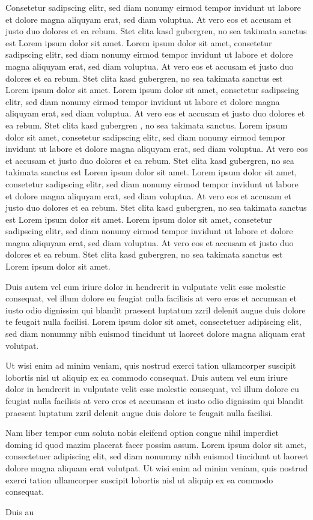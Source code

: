 Consetetur sadipscing elitr, sed diam nonumy eirmod tempor invidunt ut labore et dolore magna aliquyam erat, sed diam
voluptua. At vero eos et accusam et justo duo dolores et ea rebum. Stet clita kasd gubergren, no sea takimata sanctus
est Lorem ipsum dolor sit amet. Lorem ipsum dolor sit amet, consetetur sadipscing elitr, sed diam nonumy eirmod
tempor invidunt ut labore et dolore magna aliquyam erat, sed diam voluptua. At vero eos et accusam et justo duo
dolores et ea rebum. Stet clita kasd gubergren, no sea takimata sanctus est Lorem ipsum dolor sit amet. Lorem ipsum
dolor sit amet, consetetur sadipscing elitr, sed diam nonumy eirmod tempor invidunt ut labore et dolore magna
aliquyam erat, sed diam voluptua. At vero eos et accusam et justo duo dolores et ea rebum. Stet clita kasd gubergren
, no sea takimata sanctus. Lorem ipsum dolor sit amet, consetetur sadipscing elitr, sed diam nonumy eirmod tempor
invidunt ut labore et dolore magna aliquyam erat, sed diam voluptua. At vero eos et accusam et justo duo dolores et
ea rebum. Stet clita kasd gubergren, no sea takimata sanctus est Lorem ipsum dolor sit amet. Lorem ipsum dolor sit
amet, consetetur sadipscing elitr, sed diam nonumy eirmod tempor invidunt ut labore et dolore magna aliquyam erat,
sed diam voluptua. At vero eos et accusam et justo duo dolores et ea rebum. Stet clita kasd gubergren, no sea
takimata sanctus est Lorem ipsum dolor sit amet. Lorem ipsum dolor sit amet, consetetur sadipscing elitr, sed diam
nonumy eirmod tempor invidunt ut labore et dolore magna aliquyam erat, sed diam voluptua. At vero eos et accusam et
justo duo dolores et ea rebum. Stet clita kasd gubergren, no sea takimata sanctus est Lorem ipsum dolor sit amet.

Duis autem vel eum iriure dolor in hendrerit in vulputate velit esse molestie consequat, vel illum dolore eu feugiat
nulla facilisis at vero eros et accumsan et iusto odio dignissim qui blandit praesent luptatum zzril delenit augue
duis dolore te feugait nulla facilisi. Lorem ipsum dolor sit amet, consectetuer adipiscing elit, sed diam nonummy
nibh euismod tincidunt ut laoreet dolore magna aliquam erat volutpat.

Ut wisi enim ad minim veniam, quis nostrud exerci tation ullamcorper suscipit lobortis nisl ut aliquip ex ea commodo
consequat. Duis autem vel eum iriure dolor in hendrerit in vulputate velit esse molestie consequat, vel illum dolore
eu feugiat nulla facilisis at vero eros et accumsan et iusto odio dignissim qui blandit praesent luptatum zzril
delenit augue duis dolore te feugait nulla facilisi.

Nam liber tempor cum soluta nobis eleifend option congue nihil imperdiet doming id quod mazim placerat facer possim
assum. Lorem ipsum dolor sit amet, consectetuer adipiscing elit, sed diam nonummy nibh euismod tincidunt ut laoreet
dolore magna aliquam erat volutpat. Ut wisi enim ad minim veniam, quis nostrud exerci tation ullamcorper suscipit
lobortis nisl ut aliquip ex ea commodo consequat.

Duis au
